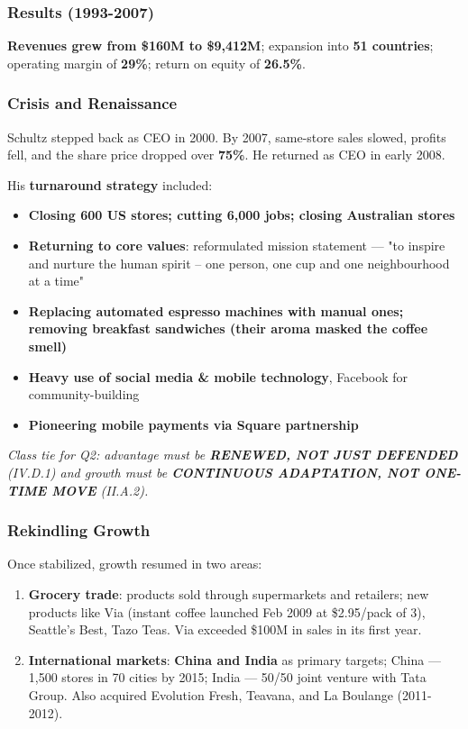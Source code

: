 \documentclass[10pt,a4paper]{article}
\newcommand{\handnote}[1]{%
  \par\noindent\footnotesize\color{notepink}\textit{#1}\par%
  \vspace{0.25em}%
}
\newcommand{\hlpink}[1]{\colorbox{pink!25}{\textbf{#1}}}
\begin{document}
\subsubsection*{\color{eublue}Results (1993-2007)}
\hlpink{Revenues grew from \$160M to \$9,412M}; expansion into \hlpink{51 countries}; operating margin of \hlpink{29\%}; return on equity of \hlpink{26.5\%}.

\subsubsection*{\color{eublue}Crisis and Renaissance}
Schultz stepped back as CEO in 2000. By 2007, same-store sales slowed, profits fell, and the share price dropped over \hlpink{75\%}. He returned as CEO in early 2008.

His \hlpink{turnaround strategy} included:
\begin{itemize}
  \item \hlpink{Closing 600 US stores; cutting 6,000 jobs; closing Australian stores}
  \item \hlpink{Returning to core values}: reformulated mission statement --- "to inspire and nurture the human spirit -- one person, one cup and one neighbourhood at a time"
  \item \hlpink{Replacing automated espresso machines with manual ones; removing breakfast sandwiches (their aroma masked the coffee smell)}
  \item \hlpink{Heavy use of social media \& mobile technology}, Facebook for community-building
  \item \hlpink{Pioneering mobile payments via Square partnership}
\end{itemize}

\handnote{Class tie for Q2: advantage must be \hlpink{RENEWED, NOT JUST DEFENDED} (IV.D.1) and growth must be \hlpink{CONTINUOUS ADAPTATION, NOT ONE-TIME MOVE} (II.A.2).}

\subsubsection*{\color{eublue}Rekindling Growth}
Once stabilized, growth resumed in two areas:
\begin{enumerate}
  \item \hlpink{Grocery trade}: products sold through supermarkets and retailers; new products like Via (instant coffee launched Feb 2009 at \$2.95/pack of 3), Seattle's Best, Tazo Teas. Via exceeded \$100M in sales in its first year.
  \item \hlpink{International markets}: \hlpink{China and India} as primary targets; China --- 1,500 stores in 70 cities by 2015; India --- 50/50 joint venture with Tata Group. Also acquired Evolution Fresh, Teavana, and La Boulange (2011-2012).
\end{enumerate}
\end{document}
